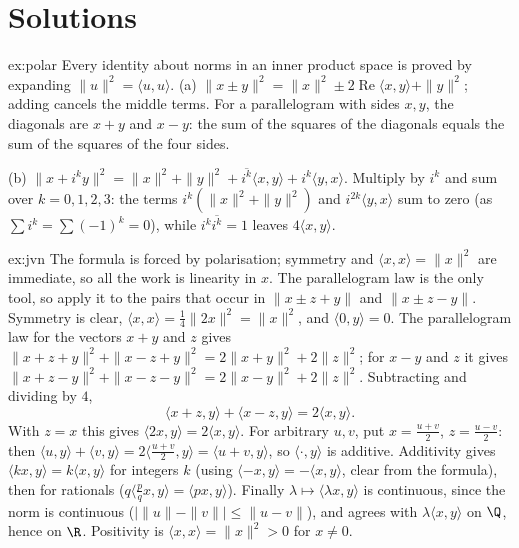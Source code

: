 \section{Solutions}

\begin{solution}{ex:polar}
\idea Every identity about norms in an inner product space is proved by expanding $\|u\|^2=\langle u,u\rangle$.
\writeup (a) $\|x\pm y\|^2=\|x\|^2\pm2\operatorname{Re}\langle x,y\rangle+\|y\|^2$; adding cancels the middle terms. For a
parallelogram with sides $x,y$, the diagonals are $x+y$ and $x-y$: the sum of the squares of the diagonals equals the sum
of the squares of the four sides.

(b) $\|x+i^ky\|^2=\|x\|^2+\|y\|^2+\overline{i^k}\langle x,y\rangle+i^k\langle y,x\rangle$. Multiply by $i^k$ and sum over
$k=0,1,2,3$: the terms $i^k(\|x\|^2+\|y\|^2)$ and $i^{2k}\langle y,x\rangle$ sum to zero (as $\sum i^k=\sum(-1)^k=0$),
while $i^k\overline{i^k}=1$ leaves $4\langle x,y\rangle$.
\end{solution}

\begin{solution}{ex:jvn}
\idea The formula is forced by polarisation; symmetry and $\langle x,x\rangle=\|x\|^2$ are immediate, so all the work is
linearity in $x$. The parallelogram law is the only tool, so apply it to the pairs that occur in
$\|x\pm z+y\|$ and $\|x\pm z-y\|$.
\writeup Symmetry is clear, $\langle x,x\rangle=\frac14\|2x\|^2=\|x\|^2$, and $\langle0,y\rangle=0$. The parallelogram
law for the vectors $x+y$ and $z$ gives $\|x+z+y\|^2+\|x-z+y\|^2=2\|x+y\|^2+2\|z\|^2$; for $x-y$ and $z$ it gives
$\|x+z-y\|^2+\|x-z-y\|^2=2\|x-y\|^2+2\|z\|^2$. Subtracting and dividing by $4$,
\[
\langle x+z,y\rangle+\langle x-z,y\rangle=2\langle x,y\rangle.
\]
With $z=x$ this gives $\langle2x,y\rangle=2\langle x,y\rangle$. For arbitrary $u,v$, put $x=\frac{u+v}2$, $z=\frac{u-v}2$:
then $\langle u,y\rangle+\langle v,y\rangle=2\langle\frac{u+v}2,y\rangle=\langle u+v,y\rangle$, so $\langle\cdot,y\rangle$
is additive. Additivity gives $\langle kx,y\rangle=k\langle x,y\rangle$ for integers $k$ (using $\langle-x,y\rangle=-\langle
x,y\rangle$, clear from the formula), then for rationals ($q\langle\frac pqx,y\rangle=\langle px,y\rangle$). Finally
$\lambda\mapsto\langle\lambda x,y\rangle$ is continuous, since the norm is continuous ($|\|u\|-\|v\||\le\|u-v\|$), and agrees
with $\lambda\langle x,y\rangle$ on $\Q$, hence on $\R$. Positivity is $\langle x,x\rangle=\|x\|^2>0$ for $x\ne0$.
\end{solution}

